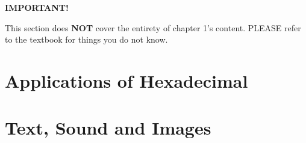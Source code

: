 \documentclass[../main.tex]{subfiles}
\begin{document}
{\LARGE \textbf{IMPORTANT!}}

This section does \textbf{NOT} cover the entirety of chapter 1's content. PLEASE refer to the textbook for things you do not know.

\section{Applications of Hexadecimal}
\label{1:sec:applications-of-hexadecimal}


\section{Text, Sound and Images}
\label{1:sec:text_sound_and_images}

\end{document}
